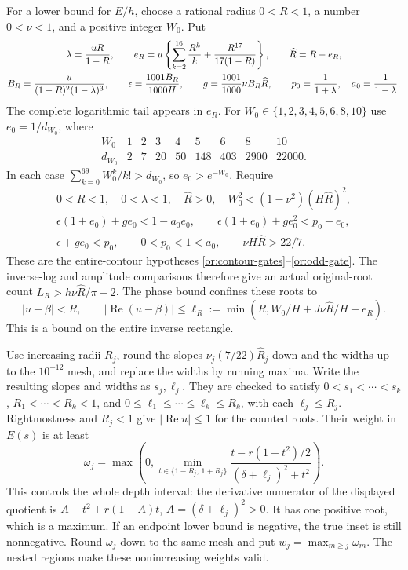 \documentclass[11pt,reqno]{amsart}
\numberwithin{equation}{section}
\theoremstyle{definition}
\theoremstyle{remark}
\renewcommand{\Re}{\operatorname{Re}}
\begin{document}
For a lower bound for $E/h$, choose a rational radius
$0<R<1$, a number $0<\nu<1$, and a positive integer $W_0$.
Put
\begin{gather}
 \lambda=\frac{uR}{1-R},\qquad
 e_R=u\left\{\sum_{k=2}^{16}\frac{R^k}{k}
                    +\frac{R^{17}}{17(1-R)}\right\},\qquad
 \widehat R=R-e_R,\label{sm:extension-inverse}\\
 B_R=\frac{u}{(1-R)^2(1-\lambda)^3},\qquad
 \epsilon=\frac{1001B_R}{1000H},\qquad
 g=\frac{1001}{1000}\nu B_R\widehat R,\qquad
 p_0=\frac1{1+\lambda},\quad a_0=\frac1{1-\lambda}.
 \notag
\end{gather}
The complete logarithmic tail appears in $e_R$.
For $W_0\in\{1,2,3,4,5,6,8,10\}$ use $e_0=1/d_{W_0}$, where
\[
\begin{array}{c|rrrrrrrr}
 W_0&1&2&3&4&5&6&8&10\\ \hline
 d_{W_0}&2&7&20&50&148&403&2900&22000 .
\end{array}
\]
In each case $\sum_{k=0}^{69}W_0^k/k!>d_{W_0}$, so
$e_0>e^{-W_0}$. Require
\begin{gather}
 0<R<1,\quad 0<\lambda<1,\quad \widehat R>0,\quad
 W_0^2<(1-\nu^2)(H\widehat R)^2,\label{sm:extension-gates-a}\\
 \epsilon(1+e_0)+ge_0<1-a_0e_0,\qquad
 \epsilon(1+e_0)+ge_0^2<p_0-e_0,\label{sm:extension-gates-b}\\
 \epsilon+ge_0<p_0,\qquad
 0<p_0<1<a_0,\qquad \nu H\widehat R>22/7.
 \label{sm:extension-gates-c}
\end{gather}
These are the entire-contour hypotheses
\eqref{or:contour-gates}--\eqref{or:odd-gate}.
The inverse-log and amplitude comparisons therefore give an
actual original-root count
$L_R>h\nu\widehat R/\pi-2$.
The phase bound confines these roots to
\begin{equation}\label{sm:extension-width}
 |u-\beta|<R,\qquad
 |\Re(u-\beta)|\le
 \ell_R:=\min(R,W_0/H+J\nu\widehat R/H+e_R).
\end{equation}
This is a bound on the entire inverse rectangle.

Use increasing radii $R_j$, round the slopes
$\nu_j(7/22)\widehat R_j$ down and the widths up to the
$10^{-12}$ mesh, and replace the widths by running maxima.
Write the resulting slopes and widths as $s_j,\ell_j$.
They are checked to satisfy
$0<s_1<\cdots<s_k$, $R_1<\cdots<R_k<1$, and
$0\le\ell_1\le\cdots\le\ell_k\le R_k$, with each
$\ell_j\le R_j$.
Rightmostness and $R_j<1$ give $|\Re u|\le1$ for the counted roots.
Their weight in $E(s)$ is at least
\begin{equation}\label{sm:extension-weight}
 \omega_j=\max\left(0,\min_{t\in\{1-R_j,\,1+R_j\}}
       \frac{t-r(1+t^2)/2}{(\delta+\ell_j)^2+t^2}\right).
\end{equation}
This controls the whole depth interval: the derivative numerator
of the displayed quotient is
$A-t^2+r(1-A)t$, $A=(\delta+\ell_j)^2>0$.
It has one positive root, which is a maximum. If an endpoint
lower bound is negative, the true inset is still nonnegative.
Round $\omega_j$ down to the same mesh and put
$w_j=\max_{m\ge j}\omega_m$.
The nested regions make these nonincreasing weights valid.
\end{document}
